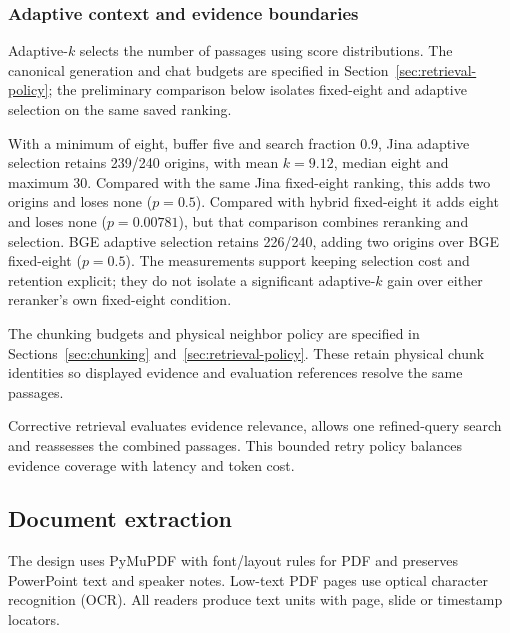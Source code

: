 \subsubsection{Adaptive context and evidence boundaries}
Adaptive-$k$ selects the number of passages using score distributions\citep{adaptive}. The canonical generation and chat budgets are specified in Section~\ref{sec:retrieval-policy}; the preliminary comparison below isolates fixed-eight and adaptive selection on the same saved ranking.

With a minimum of eight, buffer five and search fraction 0.9, Jina adaptive selection retains 239/240 origins, with mean $k=9.12$, median eight and maximum 30. Compared with the same Jina fixed-eight ranking, this adds two origins and loses none ($p=0.5$). Compared with hybrid fixed-eight it adds eight and loses none ($p=0.00781$), but that comparison combines reranking and selection. BGE adaptive selection retains 226/240, adding two origins over BGE fixed-eight ($p=0.5$). The measurements support keeping selection cost and retention explicit; they do not isolate a significant adaptive-$k$ gain over either reranker's own fixed-eight condition.

The chunking budgets and physical neighbor policy are specified in Sections~\ref{sec:chunking} and~\ref{sec:retrieval-policy}. These retain physical chunk identities so displayed evidence and evaluation references resolve the same passages.

Corrective retrieval evaluates evidence relevance, allows one refined-query search and reassesses the combined passages\citep{correctiverag}. This bounded retry policy balances evidence coverage with latency and token cost.
\subsection{Document extraction}
The design uses PyMuPDF with font/layout rules for PDF and preserves PowerPoint text and speaker notes. Low-text PDF pages use optical character recognition (OCR). All readers produce text units with page, slide or timestamp locators.

